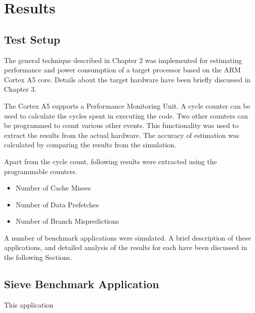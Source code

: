 \chapter{Results}

\section{Test Setup}
The general technique described in Chapter 2 was implemented for estimating performance and power consumption of a target processor based on the ARM Cortex A5 core. Details about the target hardware have been briefly discussed in Chapter 3.

The Cortex A5 supports a Performance Monitoring Unit. A cycle counter can be used to calculate the cycles spent in executing the code. Two other counters can be programmed to count various other events. This functionality was used to extract the results from the actual hardware. The accuracy of estimation was calculated by comparing the results from the simulation.

Apart from the cycle count, following results were extracted using the programmable counters.

\begin{itemize}
\item Number of Cache Misses
\item Number of Data Prefetches
\item Number of Branch Mispredictions
\end{itemize}

A number of benchmark applications were simulated. A brief description of these applications, and detailed analysis of the results for each have been discussed in the following Sections.

\section{Sieve Benchmark Application}
This application 